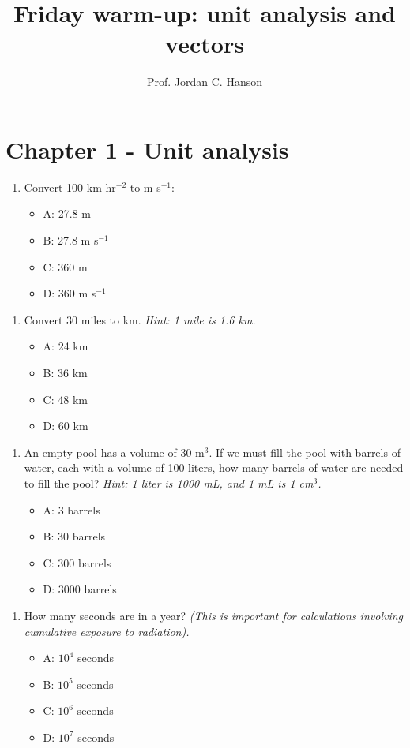 \documentclass{article}
\begin{document}
\twocolumn

\title{Friday warm-up: unit analysis and vectors}
\author{Prof. Jordan C. Hanson}

\maketitle

\section{Chapter 1 - Unit analysis}

\begin{enumerate}
\item Convert 100 km hr$^{-2}$ to m s$^{-1}$:
\begin{itemize}
\item A: 27.8 m
\item B: 27.8 m s$^{-1}$
\item C: 360 m
\item D: 360 m s$^{-1}$
\end{itemize}
\end{enumerate}

\begin{enumerate}
\item Convert 30 miles to km.  \textit{Hint: 1 mile is 1.6 km.}
\begin{itemize}
\item A: 24 km
\item B: 36 km
\item C: 48 km
\item D: 60 km
\end{itemize}
\end{enumerate}

\begin{enumerate}
\item An empty pool has a volume of 30 m$^3$.  If we must fill the pool with barrels of water, each with a volume of 100 liters, how many barrels of water are needed to fill the pool? \textit{Hint: 1 liter is 1000 mL, and 1 mL is 1 cm$^3$.}
\begin{itemize}
\item A: 3 barrels
\item B: 30 barrels
\item C: 300 barrels
\item D: 3000 barrels
\end{itemize}
\end{enumerate}

\begin{enumerate}
\item How many seconds are in a year? \textit{(This is important for calculations involving cumulative exposure to radiation).}
\begin{itemize}
\item A: $10^4$ seconds
\item B: $10^5$ seconds
\item C: $10^6$ seconds
\item D: $10^7$ seconds
\end{itemize}
\end{enumerate}
\end{document}
